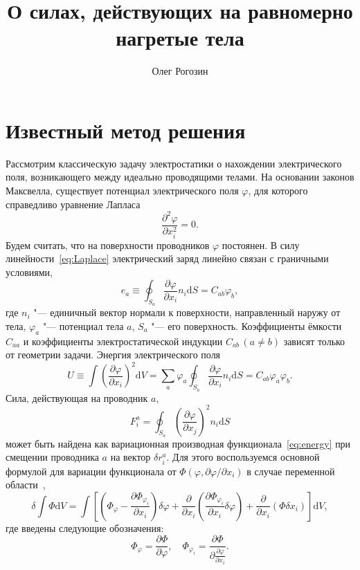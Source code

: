\documentclass{article}
\title{О силах, действующих на равномерно нагретые тела}
\author{Олег Рогозин}
\theoremstyle{plain}
\newcommand{\dd}{\mathrm{d}}
\newcommand{\pder}[2][]{\frac{\partial#1}{\partial#2}}
\newcommand{\pderdual}[2][]{\frac{\partial^2#1}{\partial#2^2}}
\newcommand{\Pder}[2][]{\partial#1/\partial#2}
\newcommand{\eqdef}{\equiv}
\begin{document}
\section{Известный метод решения}

Рассмотрим классическую задачу электростатики о нахождении электрического поля,
возникающего между идеально проводящими телами. На основании законов Максвелла,
существует потенциал электрического поля \(\varphi\), для которого справедливо
уравнение Лапласа
\begin{equation}\label{eq:Laplace}
    \pderdual[\varphi]{x_i} = 0.
\end{equation}
Будем считать, что на поверхности проводников \(\varphi\) постоянен.
В силу линейности~\eqref{eq:Laplace} электрический заряд линейно связан с граничными условиями,
\begin{equation}\label{eq:charge}
    e_a \eqdef \oint_{S_a} \pder[\varphi]{x_i}n_i\dd{S} = C_{ab} \varphi_b,
\end{equation}
где \(n_i\) "--- единичный вектор нормали к поверхности, направленный наружу от тела,
\(\varphi_a\) "--- потенциал тела \(a\), \(S_a\) "--- его поверхность.
Коэффициенты ёмкости \(C_{aa}\) и коэффициенты электростатической индукции \(C_{ab}\,(a\neq b)\)
зависят только от геометрии задачи.
Энергия электрического поля
\begin{equation}\label{eq:energy}
    U \eqdef \int \left(\pder[\varphi]{x_i}\right)^2\dd{V} =
    \sum_a \varphi_a \oint_{S_a} \pder[\varphi]{x_i}n_i\dd{S} = C_{ab} \varphi_a \varphi_b.
\end{equation}
Сила, действующая на проводник \(a\),
\begin{equation}\label{eq:force}
    F^a_i = \oint_{S_a} \left(\pder[\varphi]{x_j}\right)^2 n_i\dd{S}
\end{equation}
может быть найдена как вариационная производная функционала~\eqref{eq:energy}
при смещении проводника \(a\) на вектор \(\delta r^a_i\).
Для этого воспользуемся основной формулой для вариации функционала от \(\Phi(\varphi,\Pder[\varphi]{x_i})\)
в случае переменной области~\cite{Gelfand1961},
\begin{equation}\label{eq:variation_general}
    \delta \int \Phi \dd{V} = \int \left[
        \left( \Phi_\varphi - \pder[\Phi_{\varphi_i}]{x_i} \right) \delta\varphi +
        \pder{x_i}\left( \pder[\Phi_{\varphi_i}]{x_i} \delta\varphi \right) +
        \pder{x_i}\left( \Phi \delta x_i \right)
    \right]\dd{V},
\end{equation}
где введены следующие обозначения:
\begin{equation}\label{eq:Phi_derivatives}
    \Phi_\varphi = \pder[\Phi]{\varphi}, \quad \Phi_{\varphi_i} = \pder[\Phi]{\pder[\varphi]{x_i}}.
\end{equation}
\end{document}
